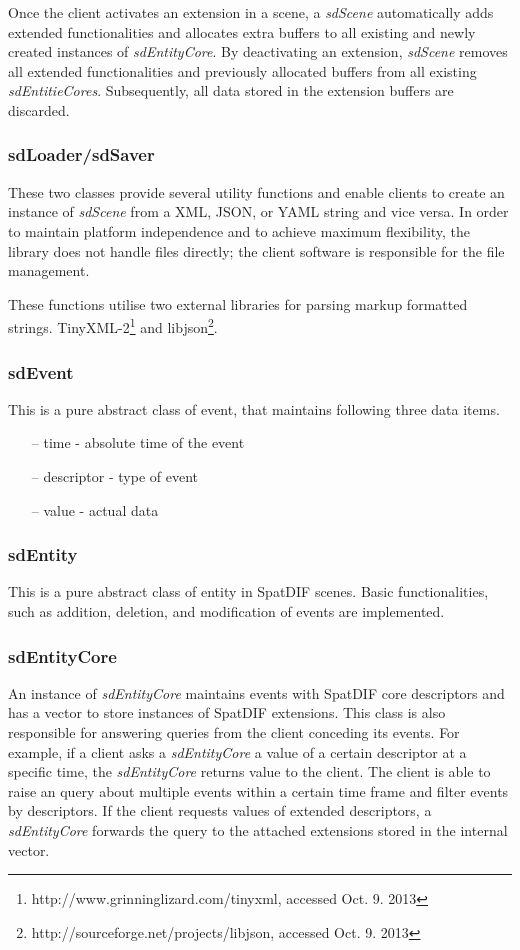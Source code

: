 \documentclass[a4paper]{article}
\begin{document}
Once the client activates an extension in a scene, a {\it sdScene} automatically adds extended functionalities and allocates extra buffers to all existing and newly created instances of {\it sdEntityCore}. 
By deactivating an extension, {\it sdScene} removes all extended functionalities and previously allocated buffers from all existing {\it sdEntitieCores}. 
Subsequently, all data stored in the extension buffers are discarded.

\subsubsection{sdLoader/sdSaver}
These two classes provide several utility functions and enable clients to create an instance of {\it sdScene} from a XML, JSON, or YAML string and vice versa. 
In order to maintain platform independence and to achieve maximum flexibility, the library does not handle files directly; the client software is responsible for the file management. 

These functions utilise two external libraries for parsing markup formatted strings. TinyXML-2\footnote{http://www.grinninglizard.com/tinyxml, accessed Oct. 9. 2013} and libjson\footnote{http://sourceforge.net/projects/libjson, accessed Oct. 9. 2013}.

\subsubsection{sdEvent}
This is a pure abstract class of event, that maintains following three data items.

\begin{itemize}[leftmargin=*]
\item[--] time - absolute time of the event
\item[--] descriptor - type of event
\item[--] value - actual data
\end{itemize}

\subsubsection{sdEntity}
This is a pure abstract class of entity in SpatDIF scenes. Basic functionalities, such as addition, deletion, and modification of events are implemented.

\subsubsection{sdEntityCore}
An instance of {\it sdEntityCore} maintains events with SpatDIF core descriptors and has a vector to store instances of SpatDIF extensions. 
This class is also responsible for answering queries from the client conceding its events. For example, if a client asks a {\it sdEntityCore} a value of a certain descriptor at a specific time, the {\it sdEntityCore} returns value to the client. 
The client is able to raise an query about multiple events within a certain time frame and filter events by descriptors. If the client requests values of extended descriptors, a {\it sdEntityCore} forwards the query to the attached extensions stored in the internal vector.
\end{document}
